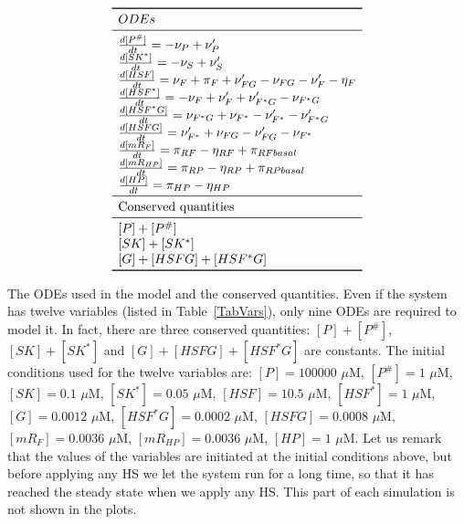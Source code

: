 \documentclass[oneside, 10pt, a4paper, twocolumn]{article}
\begin{document}
\bgroup
\def\arraystretch{1.5}%
\begin{table}[h!]
\[\begin{array}{l}
\toprule
 ODEs \\
\midrule
 \frac{d[P^\#]}{dt} = - \nu_P + \nu_P' \\
 \frac{d[SK^*]}{dt} = - \nu_S + \nu_S' \\ 
 \frac{d[HSF]}{dt} = \nu_F + \pi_F + \nu_{FG}' - \nu_{FG} - \nu_{F}' - \eta_F \\  
 \frac{d[HSF^*]}{dt} =  - \nu_F + \nu_F' + \nu_{F^*G}' - \nu_{F^*G} \\
 \frac{d[HSF^*G]}{dt} = \nu_{F^*G} + \nu_{F^*} - \nu_{F^*}' - \nu_{F^*G}' \\
 \frac{d[HSFG]}{dt} = \nu_{F^*}' + \nu_{FG} - \nu_{FG}' - \nu_{F^*} \\
 \frac{d[mR_F]}{dt} = \pi_{RF} - \eta_{RF} + \pi_{RFbasal}\\
 \frac{d[mR_{HP}]}{dt} = \pi_{RP} - \eta_{RP} + \pi_{RPbasal}\\
 \frac{d[HP]}{dt} = \pi_{HP} - \eta_{HP} \\
\midrule
 \text{Conserved quantities} \\
\midrule
 {[P]} + {[P^\#]} \\
 {[SK]} + {[SK^*]} \\
 {[G]} + {[HSFG]} + {[HSF^*G]} \\
\bottomrule
\end{array}\]
\caption{The ODEs used in the model and the conserved quantities. 
Even if the system has twelve variables (listed in Table~\ref{TabVars}), only nine ODEs are required to model it. 
In fact, there are three conserved quantities: $[P] + [P^\#]$, $[SK] + [SK^*]$ and $[G] + [HSFG] + [HSF^*G]$ are constants. 
The initial conditions used for the twelve variables are: 
 $\left[P\right] = 100000$ $\mu$M,
 $\left[P^\#\right] = 1$ $\mu$M,
 $\left[SK\right] = 0.1$ $\mu$M,
 $\left[SK^*\right] = 0.05$ $\mu$M,
 $\left[HSF\right] = 10.5$ $\mu$M,
 $\left[HSF^*\right] = 1$ $\mu$M,
 $\left[G\right] = 0.0012$ $\mu$M,
 $\left[HSF^*G\right] = 0.0002$ $\mu$M,
 $\left[HSFG\right] = 0.0008$ $\mu$M,
 $\left[mR_F\right] = 0.0036$ $\mu$M,
 $\left[mR_{HP}\right] = 0.0036$ $\mu$M,
 $\left[HP\right] = 1$ $\mu$M. 
Let us remark that the values of the variables are initiated at the initial conditions above, but before applying any HS we let the system run for a long time, so that it has reached the steady state when we apply any HS. This part of each simulation is not shown in the plots.}\label{TabODEs}
\end{table}
\egroup
\end{document}
